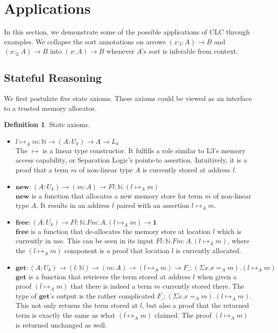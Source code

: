 \documentclass[sigplan,screen]{acmart}
\theoremstyle{definition}
\newtheorem{definition}{Definition}[section]
\newcommand{\new}{\textbf{new}}
\newcommand{\free}{\textbf{free}}
\newcommand{\get}{\textbf{get}}
\newcommand{\utype}{:_{\scriptscriptstyle U}}
\newcommand{\ltype}{:_{\scriptscriptstyle L}}
\begin{document}
  \section{Applications}
  In this section, we demonstrate some of the possible applications of CLC through examples. We collapse the sort annotations on arrows $(x \utype A) \rightarrow B$ and $(x \ltype A) \rightarrow B$ into $(x : A) \rightarrow B$ whenever $A$'s sort is inferable from context.

  \subsection{Stateful Reasoning}
  We first postulate five state axioms. These axioms could be viewed as an interface to a trusted memory allocator.
  \begin{definition}
    State axioms.
    \begin{itemize}
      \item $l \mapsto_A m : \mathbb{N} \rightarrow (A : U_k) \rightarrow A \rightarrow L_k$ \\
      The $\mapsto$ is a linear type constructor. It fulfills a role similar to L3's \cite{l3} memory access capability, or Separation Logic's \cite{reynolds02} points-to assertion. Intuitively, it is a proof that a term $m$ of non-linear type $A$ is currently stored at address $l$.
      \item $\new : (A : U_k) \rightarrow (m : A) \rightarrow F l:\mathbb{N}.(l \mapsto_A m)$ \\
      $\new$ is a function that allocates a new memory store for term $m$ of non-linear type $A$. It results in an address $l$ paired with an assertion $l \mapsto_A m$.
      \item $\free : (A : U_k) \rightarrow F l:\mathbb{N}.F m:A.(l \mapsto_A m) \rightarrow \mathbf{1}$ \\
      $\free$ is a function that de-allocates the memory store at location $l$ which is currently in use. This can be seen in its input $F l:\mathbb{N}.F m:A.(l \mapsto_A m)$, where the $(l \mapsto_A m)$ component is a proof that location $l$ is currently allocated.
      \item $\get : (A : U_k) \rightarrow (l : \mathbb{N}) \rightarrow (m : A) \rightarrow (l \mapsto_A m) \rightarrow F \_: (\Sigma x. x =_A m). (l \mapsto_A m)$ \\
      $\get$ is a function that retrieves the term stored at address $l$ when given a proof $(l \mapsto_A m)$ that there is indeed a term $m$ currently stored there. The type of $\get$'s output is the rather complicated $F \_: (\Sigma x. x =_A m). (l \mapsto_A m)$. This not only returns the term stored at $l$, but also a proof that the returned term is exactly the same as what $(l \mapsto_A m)$ claimed. The proof $(l \mapsto_A m)$ is returned unchanged as well.

\end{itemize}
\end{definition}
\end{document}

